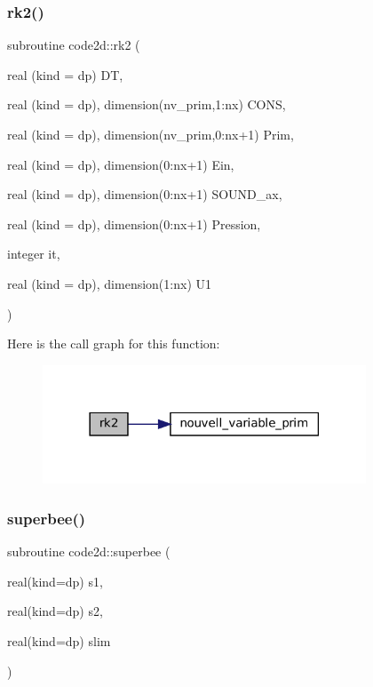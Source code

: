\subsubsection{\texorpdfstring{rk2()}{rk2()}}
{\footnotesize\ttfamily subroutine code2d\+::rk2 (\begin{DoxyParamCaption}\item[{real (kind = dp)}]{DT,  }\item[{real (kind = dp), dimension(nv\+\_\+prim,1\+:nx)}]{C\+O\+NS,  }\item[{real (kind = dp), dimension(nv\+\_\+prim,0\+:nx+1)}]{Prim,  }\item[{real (kind = dp), dimension(0\+:nx+1)}]{Ein,  }\item[{real (kind = dp), dimension(0\+:nx+1)}]{S\+O\+U\+N\+D\+\_\+ax,  }\item[{real (kind = dp), dimension(0\+:nx+1)}]{Pression,  }\item[{integer}]{it,  }\item[{real (kind = dp), dimension(1\+:nx)}]{U1 }\end{DoxyParamCaption})}

Here is the call graph for this function\+:
\nopagebreak
\begin{figure}[H]
\begin{center}
\leavevmode
\includegraphics[width=273pt]{main1DOr2_8f90_abf018793b221c901580957ed90346b9d_cgraph}
\end{center}
\end{figure}
\mbox{\label{main1DOr2_8f90_a1584e44687072629ab256df4b8fe6537}} 
\subsubsection{\texorpdfstring{superbee()}{superbee()}}
{\footnotesize\ttfamily subroutine code2d\+::superbee (\begin{DoxyParamCaption}\item[{real(kind=dp)}]{s1,  }\item[{real(kind=dp)}]{s2,  }\item[{real(kind=dp)}]{slim }\end{DoxyParamCaption})}

